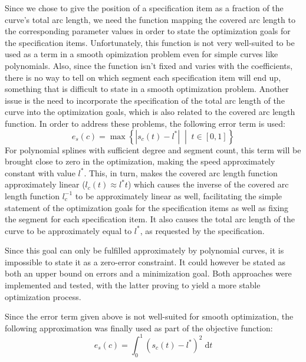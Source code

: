 \documentclass[a4paper]{article}
\newcommand{\apply}[2]{#1\!\left(#2\right)}
\begin{document}
				Since we chose to give the position of a specification item as a fraction of the curve's total arc length, we need the function mapping the covered arc length to the corresponding parameter values in order to state the optimization goals for the specification items. Unfortunately, this function is not very well-suited to be used as a term in a smooth opimization problem even for simple curves like polynomials. Also, since the function isn't fixed and varies with the coefficients, there is no way to tell on which segment each specification item will end up, something that is difficult to state in a smooth optimization problem. Another issue is the need to incorporate the specification of the total arc length of the curve into the optimization goals, which is also related to the covered arc length function. In order to address these problems, the following error term is used:
				\begin{equation*}
					\apply{e_s}{c} = \max \left\{\left|\apply{s_c}{t} - l^*\right| \; \middle| \; t \in \left[0, 1\right]\right\}
				\end{equation*}
				For polynomial splines with sufficient degree and segment count, this term will be brought close to zero in the optimization, making the speed approximately constant with value \(l^*\). This, in turn, makes the covered arc length function approximately linear (\(\apply{l_c}{t} \approx l^*t\)) which causes the inverse of the covered arc length function \(l_c^{-1}\) to be approximately linear as well, facilitating the simple statement of the optimization goals for the specification items as well as fixing the segment for each specification item. It also causes the total arc length of the curve to be approximately equal to \(l^*\), as requested by the specification.

				Since this goal can only be fulfilled approximately by polynomial curves, it is impossible to state it as a zero-error constraint. It could however be stated as both an upper bound on errors and a minimization goal. Both approaches were implemented and tested, with the latter proving to yield a more stable optimization process.

				Since the error term given above is not well-suited for smooth optimization, the following approximation was finally used as part of the objective function:
				\begin{equation*}
					\apply{e_s}{c} = \int_{0}^{1}\left(\apply{s_c}{t} - l^*\right)^2\;\mathrm{d}t
				\end{equation*}
\end{document}
